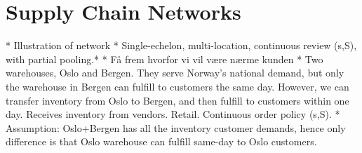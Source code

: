 \documentclass[../../main.tex]{subfiles}
\begin{document}

\section{Supply Chain Networks}

*	Illustration of network
*	Single-echelon, multi-location, continuous review (s,S), with partial pooling.*
*	Få frem hvorfor vi vil være nærme kunden
*	Two warehouses, Oslo and Bergen. They serve Norway’s national demand, but only the warehouse in Bergen can fulfill to customers the same day. However, we can transfer inventory from Oslo to Bergen, and then fulfill to customers within one day. Receives inventory from vendors. Retail. Continuous order policy (s,S). 
*	Assumption: Oslo+Bergen has all the inventory customer demands, hence only difference is that Oslo warehouse can fulfill same-day to Oslo customers.

\end{document}
